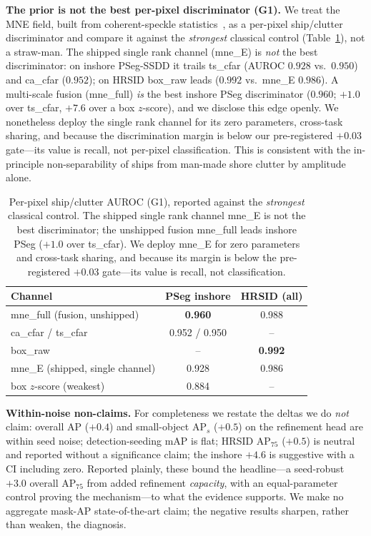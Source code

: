 \textbf{The prior is not the best per-pixel discriminator (G1).} We treat the MNE field, built from coherent-speckle statistics~\cite{goodman1976speckle}, as a per-pixel ship/clutter discriminator and compare it against the \emph{strongest} classical control (Table~\ref{tab:g1}), not a straw-man. The shipped single rank channel (mne\_E) is \emph{not} the best discriminator: on inshore PSeg-SSDD it trails ts\_cfar (AUROC $0.928$ vs.\ $0.950$) and ca\_cfar ($0.952$); on HRSID box\_raw leads ($0.992$ vs.\ mne\_E $0.986$). A multi-scale fusion (mne\_full) \emph{is} the best inshore PSeg discriminator ($0.960$; $+1.0$ over ts\_cfar, $+7.6$ over a box $z$-score), and we disclose this edge openly. We nonetheless deploy the single rank channel for its zero parameters, cross-task sharing, and because the discrimination margin is below our pre-registered $+0.03$ gate---its value is recall, not per-pixel classification. This is consistent with the in-principle non-separability of ships from man-made shore clutter by amplitude alone.

\begin{table}[t]
\centering
\caption{Per-pixel ship/clutter AUROC (G1), reported against the \emph{strongest} classical control. The shipped single rank channel mne\_E is not the best discriminator; the unshipped fusion mne\_full leads inshore PSeg ($+1.0$ over ts\_cfar). We deploy mne\_E for zero parameters and cross-task sharing, and because its margin is below the pre-registered $+0.03$ gate---its value is recall, not classification.}
\label{tab:g1}
\begin{tabular}{@{}lcc@{}}
\toprule
Channel & PSeg inshore & HRSID (all) \\
\midrule
mne\_full (fusion, unshipped)   & \textbf{0.960} & 0.988 \\
ca\_cfar / ts\_cfar             & 0.952 / 0.950 & -- \\
box\_raw                        & --            & \textbf{0.992} \\
mne\_E (shipped, single channel)& 0.928         & 0.986 \\
box $z$-score (weakest)         & 0.884         & -- \\
\bottomrule
\end{tabular}
\end{table}

\textbf{Within-noise non-claims.} For completeness we restate the deltas we do \emph{not} claim: overall AP ($+0.4$) and small-object AP$_{s}$ ($+0.5$) on the refinement head are within seed noise; detection-seeding mAP is flat; HRSID AP$_{75}$ ($+0.5$) is neutral and reported without a significance claim; the inshore $+4.6$ is suggestive with a CI including zero. Reported plainly, these bound the headline---a seed-robust $+3.0$ overall AP$_{75}$ from added refinement \emph{capacity}, with an equal-parameter control proving the mechanism---to what the evidence supports. We make no aggregate mask-AP state-of-the-art claim; the negative results sharpen, rather than weaken, the diagnosis.

